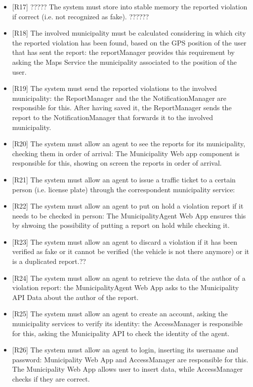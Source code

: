 \documentclass[a4paper]{report}
\begin{document}
\begin{itemize}
\item {[R17]}	\label{R17} ????? The system must store into stable memory the reported violation if correct (i.e. not recognized as fake). ??????
\item {[R18]}	\label{R18}The involved municipality must be calculated considering in which city the reported violation has been found, based on the GPS position of the user that has sent the report: the reportManager provides this requirement by asking the Maps Service the municipality associated to the position of the user.
\item {[R19]}	\label{R19}The system must send the reported violations to the involved municipality: the ReportManager and the the NotificationManager are responsible for this. After having saved it, the ReportManager sends the report to the NotificationManager that forwards it to the involved municipality.
\item {[R20]}   \label{R20}The system must allow an agent to see the reports for its municipality, checking them in order of arrival: The Municipality Web app component is responsible for this, showing on screen the reports in order of arrival.
\item {[R21]}	\label{R21}The system must allow an agent to issue a traffic ticket to a certain person (i.e. license plate) through the correspondent municipality service:
\item {[R22]}	\label{R22}The system must allow an agent to put on hold a violation report if it needs to be checked in person: The MunicipalityAgent Web App ensures this by shwoing the possibility of putting a report on hold while checking it.
\item {[R23]}	\label{R23}The system must allow an agent to discard a violation if it has been verified as fake or it cannot be verified (the vehicle is not there anymore) or it is a duplicated report.??
\item {[R24]}	\label{R24}The system must allow an agent to retrieve the data of the author of a violation report: the MunicipalityAgent Web App asks to the Municipality API Data about the author of the report. 
\item {[R25]}	\label{R25}The system must allow an agent to create an account, asking the municipality services to verify its identity: the AccessManager is responsible for this, asking the Municipality API to check the identity of the agent.
\item {[R26]}	\label{R26}The system must allow an agent to login, inserting its username and password: Municipality Web App and AccessManager are responsible for this. The Municipality Web App allows user to insert data, while AccessManager checks if they are correct.

\end{itemize}
\end{document}
